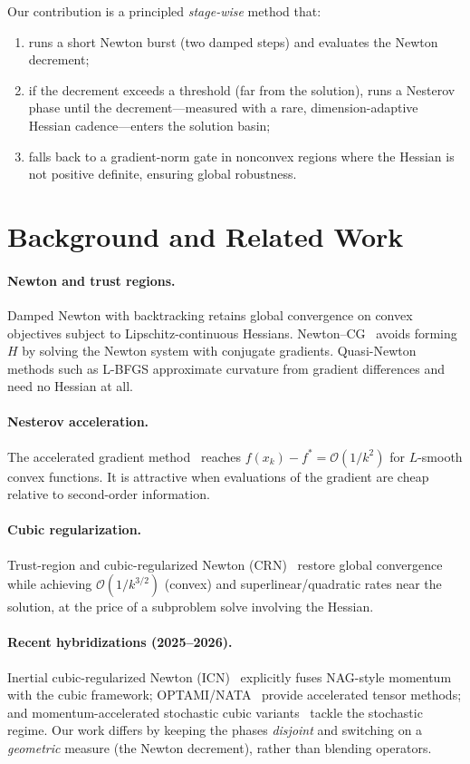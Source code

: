 \documentclass[11pt]{article}
\begin{document}
Our contribution is a principled \emph{stage-wise} method that:
\begin{enumerate}
  \item runs a short Newton burst (two damped steps) and evaluates the Newton decrement;
  \item if the decrement exceeds a threshold (far from the solution), runs a Nesterov phase
        until the decrement---measured with a rare, dimension-adaptive Hessian
        cadence---enters the solution basin;
  \item falls back to a gradient-norm gate in nonconvex regions where the Hessian is not
        positive definite, ensuring global robustness.
\end{enumerate}

\section{Background and Related Work}
\label{sec:related}

\paragraph{Newton and trust regions.}
Damped Newton with backtracking retains global convergence on convex objectives subject to
Lipschitz-continuous Hessians. Newton--CG~\cite{nocedal2006} avoids forming $H$ by solving
the Newton system with conjugate gradients. Quasi-Newton methods such as L-BFGS
approximate curvature from gradient differences and need no Hessian at all.

\paragraph{Nesterov acceleration.}
The accelerated gradient method~\cite{nesterov1983} reaches $f(x_k)-f^*=\mathcal{O}(1/k^2)$
for $L$-smooth convex functions. It is attractive when evaluations of the gradient are cheap
relative to second-order information.

\paragraph{Cubic regularization.}
Trust-region and cubic-regularized Newton
(CRN)~\cite{nocedal2006,nesterovpolyak2006} restore global convergence while achieving
$\mathcal{O}(1/k^{3/2})$ (convex) and superlinear/quadratic rates near the solution, at the
price of a subproblem solve involving the Hessian.

\paragraph{Recent hybridizations (2025--2026).}
Inertial cubic-regularized Newton (ICN)~\cite{icn2026} explicitly fuses NAG-style momentum
with the cubic framework; OPTAMI/NATA~\cite{optami2025} provide accelerated tensor methods;
and momentum-accelerated stochastic cubic variants~\cite{aistats2025} tackle the stochastic
regime. Our work differs by keeping the phases \emph{disjoint} and switching on a
\emph{geometric} measure (the Newton decrement), rather than blending operators.
\end{document}
